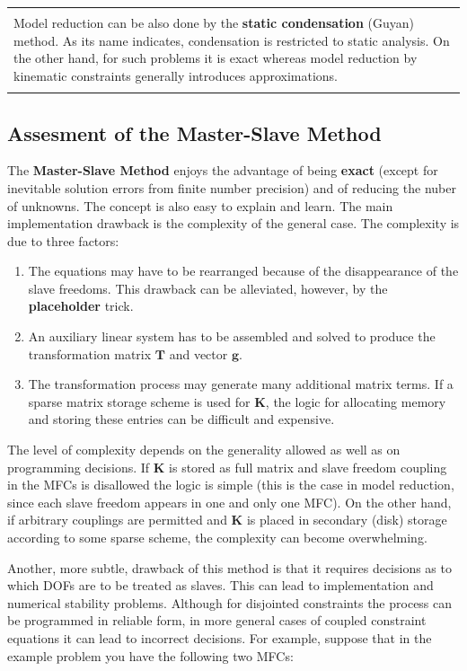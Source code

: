 \documentclass[10pt,b5paper,titlepage]{book}
\newcommand{\m}{\mathbf}
\newenvironment{bbox}[1][0.96]
{
    \begin{center}
        \begin{tabular}{|p{#1\textwidth}|}
            \hline\\
}
{
            \\\\\hline
        \end{tabular}
    \end{center}
}
\begin{document}
\begin{bbox}
    Model reduction can be also done by the \textbf{static condensation} (Guyan)
    method. As its name indicates, condensation is restricted to static analysis.
    On the other hand, for such problems it is exact whereas model reduction by
    kinematic constraints generally introduces approximations.
\end{bbox}


\subsection{Assesment of the Master-Slave Method}

The \textbf{Master-Slave Method} enjoys the advantage of being \textbf{exact}
(except for inevitable solution errors from finite number precision) and of
reducing the nuber of unknowns. The concept is also easy to explain and learn.
The main implementation drawback is the complexity of the general case.
The complexity is due to three factors:

\begin{enumerate}
    \item The equations may have to be rearranged because of the disappearance
        of the slave freedoms. This drawback can be alleviated, however,
        by the \textbf{placeholder} trick.

    \item An auxiliary linear system has to be assembled and solved to produce
        the transformation matrix $ \m{T} $ and vector $ \m{g} $.

    \item The transformation process may generate many additional matrix terms.
        If a sparse matrix storage scheme is used for $ \m{K} $, the logic
        for allocating memory and storing these entries can be difficult
        and expensive.
\end{enumerate}

The level of complexity depends on the generality allowed as well as on programming
decisions. If $ \m{K} $  is stored as full matrix and slave freedom coupling in
the MFCs is disallowed the logic is simple (this is the case in model reduction,
since each slave freedom appears in one and only one MFC). On the other hand,
if arbitrary couplings are permitted and $ \m{K} $ is placed in secondary
(disk) storage according to some sparse scheme, the complexity can become
overwhelming.

Another, more subtle, drawback of this method is that it requires decisions as to
which DOFs are to be treated as slaves. This can lead to implementation and numerical
stability problems. Although for disjointed constraints the process can be programmed
in reliable form, in more general cases of coupled constraint equations it can
lead to incorrect decisions. For example, suppose that in the example problem
you have the following two MFCs:
\end{document}
